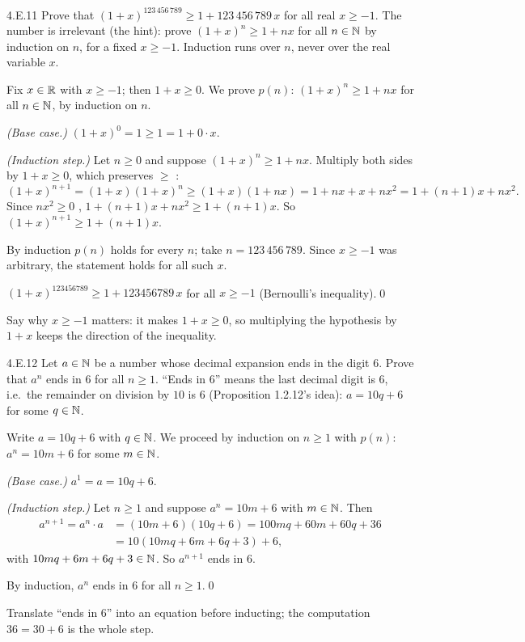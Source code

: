 \begin{bookex}[essential]{4.E.11}
Prove that $(1+x)^{123\,456\,789}\ge1+123\,456\,789\,x$ for all real $x\ge-1$.
\solution
\plan The number is irrelevant (the hint): prove $(1+x)^n\ge1+nx$ for all $n\in\mathbb{N}$ by induction on $n$, for a fixed $x\ge-1$. Induction runs over $n$, never over the real variable $x$.
\begin{steps}
\item Fix $x\in\mathbb{R}$ with $x\ge-1$; then $1+x\ge0$. We prove $p(n)$: $(1+x)^n\ge1+nx$ for all $n\in\mathbb{N}$, by induction on $n$.
\item \emph{(Base case.)} $(1+x)^0=1\ge1=1+0\cdot x$.
\item \emph{(Induction step.)} Let $n\ge0$ and suppose $(1+x)^n\ge1+nx$. Multiply both sides by $1+x\ge0$, which preserves $\ge$ :
\[
(1+x)^{n+1}=(1+x)(1+x)^n\ge(1+x)(1+nx)=1+nx+x+nx^2=1+(n+1)x+nx^2 .
\]
Since $nx^2\ge0$ , $1+(n+1)x+nx^2\ge1+(n+1)x$. So $(1+x)^{n+1}\ge1+(n+1)x$.
\item By induction $p(n)$ holds for every $n$; take $n=123\,456\,789$. Since $x\ge-1$ was arbitrary, the statement holds for all such $x$.
\end{steps}
\conclusion $(1+x)^{123456789}\ge1+123456789\,x$ for all $x\ge-1$ (Bernoulli's inequality).\qed
\begin{compare}
\item Say why $x\ge-1$ matters: it makes $1+x\ge0$, so multiplying the hypothesis by $1+x$ keeps the direction of the inequality.
\end{compare}
\end{bookex}

\begin{bookex}[recommended]{4.E.12}
Let $a\in\mathbb{N}$ be a number whose decimal expansion ends in the digit $6$. Prove that $a^n$ ends in $6$ for all $n\ge1$.
\solution
\given ``Ends in $6$'' means the last decimal digit is $6$, i.e.\ the remainder on division by $10$ is $6$ (Proposition 1.2.12's idea): $a=10q+6$ for some $q\in\mathbb{N}$.
\begin{steps}
\item Write $a=10q+6$ with $q\in\mathbb{N}$. We proceed by induction on $n\ge1$ with $p(n)$: $a^n=10m+6$ for some $m\in\mathbb{N}$.
\item \emph{(Base case.)} $a^1=a=10q+6$.
\item \emph{(Induction step.)} Let $n\ge1$ and suppose $a^n=10m+6$ with $m\in\mathbb{N}$. Then
\begin{align*}
a^{n+1}=a^n\cdot a&=(10m+6)(10q+6)=100mq+60m+60q+36\\
&=10(10mq+6m+6q+3)+6,
\end{align*}
with $10mq+6m+6q+3\in\mathbb{N}$. So $a^{n+1}$ ends in $6$.
\end{steps}
\conclusion By induction, $a^n$ ends in $6$ for all $n\ge1$.\qed
\begin{compare}
\item Translate ``ends in $6$'' into an equation before inducting; the computation $36=30+6$ is the whole step.
\end{compare}
\end{bookex}

